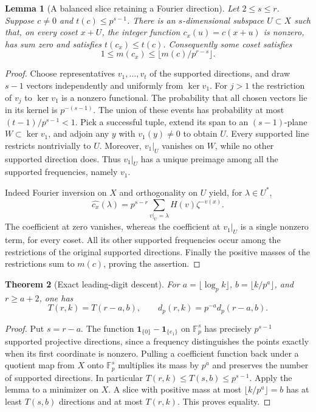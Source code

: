 \documentclass[11pt]{article}
\newtheorem{theorem}{Theorem}[section]
\newtheorem{lemma}[theorem]{Lemma}
\begin{document}
\begin{lemma}[A balanced slice retaining a Fourier direction]
Let $2\le s\le r$. Suppose $c\ne0$ and $t(c)\le p^{s-1}$. There is an $s$-dimensional subspace $U\subset X$ such that, on every coset $x+U$, the integer function $c_x(u)=c(x+u)$ is nonzero, has sum zero and satisfies $t(c_x)\le t(c)$. Consequently some coset satisfies
\[
             1\le m(c_x)\le \lfloor m(c)/p^{r-s}\rfloor .
\]
\end{lemma}
\begin{proof}
Choose representatives $v_1,\ldots,v_t$ of the supported directions, and draw $s-1$ vectors independently and uniformly from $\ker v_1$. For $j>1$ the restriction of $v_j$ to $\ker v_1$ is a nonzero functional. The probability that all chosen vectors lie in its kernel is $p^{-(s-1)}$. The union of these events has probability at most $(t-1)/p^{s-1}<1$. Pick a successful tuple, extend its span to an $(s-1)$-plane $W\subset\ker v_1$, and adjoin any $y$ with $v_1(y)\ne0$ to obtain $U$. Every supported line restricts nontrivially to $U$. Moreover, $v_1|_U$ vanishes on $W$, while no other supported direction does. Thus $v_1|_U$ has a unique preimage among all the supported frequencies, namely $v_1$.

Indeed Fourier inversion on $X$ and orthogonality on $U$ yield, for $\lambda\in U^*$,
\[
 \widehat{c_x}(\lambda)=p^{s-r}
       \sum_{v|_U=\lambda}H(v)\zeta^{-v(x)} .
\]
The coefficient at zero vanishes, whereas the coefficient at $v_1|_U$ is a single nonzero term, for every coset. All its other supported frequencies occur among the restrictions of the original supported directions. Finally the positive masses of the restrictions sum to $m(c)$, proving the assertion.
\end{proof}

\begin{theorem}[Exact leading-digit descent]
For $a=\lfloor\log_p k\rfloor$, $b=\lfloor k/p^a\rfloor$, and $r\ge a+2$, one has
\[
 T(r,k)=T(r-a,b),\qquad
 d_p(r,k)=p^{-a}d_p(r-a,b).
\]
\end{theorem}
\begin{proof}
Put $s=r-a$. The function $\mathbf1_{\{0\}}-\mathbf1_{\{e_1\}}$ on $\mathbb F_p^s$ has precisely $p^{s-1}$ supported projective directions, since a frequency distinguishes the points exactly when its first coordinate is nonzero. Pulling a coefficient function back under a quotient map from $X$ onto $\mathbb F_p^s$ multiplies its mass by $p^a$ and preserves the number of supported directions. In particular $T(r,k)\le T(s,b)\le p^{s-1}$. Apply the lemma to a minimizer on $X$. A slice with positive mass at most $\lfloor k/p^a\rfloor=b$ has at least $T(s,b)$ directions and at most $T(r,k)$. This proves equality.
\end{proof}
\end{document}
